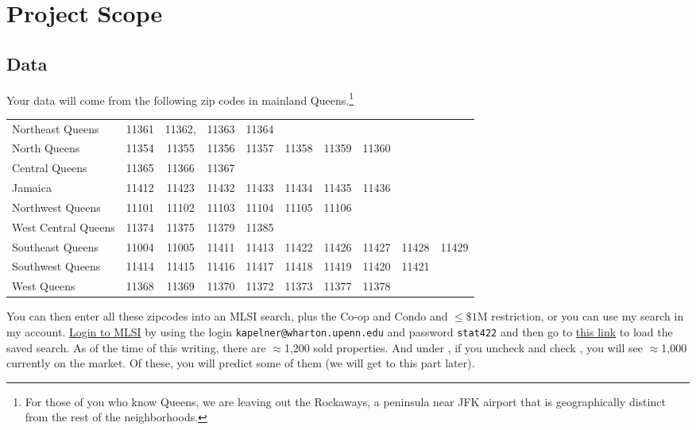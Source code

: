 \documentclass[12pt]{article}
\begin{document}
\section{Project Scope}

\subsection{Data}

Your data will come from the following zip codes in mainland Queens.\footnote{For those of you who know Queens, we are leaving out the Rockaways, a peninsula near JFK airport that is geographically distinct from the rest of the neighborhoods.}

\begin{table}[htp]
\centering\small
\begin{tabular}{l|ccccccccc}
\hline
Northeast Queens		&11361& 11362,& 11363& 11364 \\
North Queens		&11354& 11355& 11356& 11357& 11358& 11359& 11360 \\
Central Queens		&11365& 11366& 11367 \\
Jamaica				&11412& 11423& 11432& 11433& 11434& 11435& 11436 \\
Northwest Queens	&11101& 11102& 11103& 11104& 11105& 11106 \\
West Central Queens	&11374& 11375& 11379& 11385 \\
Southeast Queens		&11004& 11005& 11411& 11413& 11422& 11426& 11427& 11428& 11429 \\
Southwest Queens	&11414& 11415& 11416& 11417& 11418& 11419& 11420& 11421 \\
West Queens			&11368& 11369& 11370& 11372& 11373& 11377& 11378 \\\hline
\end{tabular}
\end{table}

You can then enter all these zipcodes into an MLSI search, plus the Co-op and Condo and $\leq \$1$M restriction, or you can use my search in my account. \href{https://secure.mlsli.com/Account/CustomerLogin.aspx}{Login to MLSI} by using the login \texttt{kapelner@wharton.upenn.edu} and password \texttt{stat422} and then go to \href{http://www.mlsli.com/listing/listingsearch.aspx?ListingSearch=1455845}{this link} to load the saved search. As of the time of this writing, there are $\approx$1,200 sold properties. And under , if you uncheck  and check , you will see $\approx$1,000 currently on the market. Of these, you will predict some of them (we will get to this part later).\\
\end{document}
